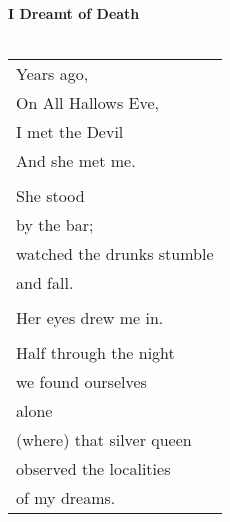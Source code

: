 \documentclass{article}
\begin{document}
\newcommand{\h}{\hspace{3ex}}
\newcommand{\hoar}{%
\begin{center}
\line(1,0){350}
\end{center}
}

\noindent
\textbf{I Dreamt of Death}\\\\
\begin{tabular}{l}
Years ago, \\
On All Hallows Eve, \\
I met the Devil \\
And she met me. \\
\\
She stood \\
by the bar; \\
watched the drunks stumble \\
and fall. \\
\\
Her eyes drew me in. \\
\\
Half through the night \\
we found ourselves \\
alone \\
(where) that silver queen \\
observed the localities \\
of my dreams. \\
\end{tabular} \\
\end{document}
